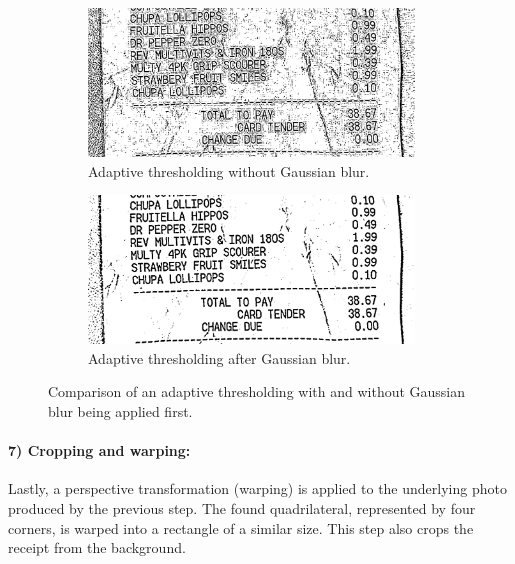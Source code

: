 \documentclass[
  digital, %
  table,   %
  oneside, %
  lof,     %
  lot,     %
]{fithesis3}
\newcommand\half{0.45}
\newcommand\subfigsize{0.95}
\begin{document}
\begin{figure}
    \centering
    \begin{subfigure}[t]{\half\textwidth}
      \centering
      \includegraphics[width=\subfigsize\textwidth]{figures/image_processing/adaptive_thresholding_no_blur}
      \caption{Adaptive thresholding without Gaussian blur.}
    \end{subfigure}
    \begin{subfigure}[t]{\half\textwidth}
      \centering
      \includegraphics[width=\subfigsize\textwidth]{figures/image_processing/adaptive_thresholding}
      \caption{Adaptive thresholding after Gaussian blur.}
    \end{subfigure}
    \caption{Comparison of an adaptive thresholding with and without Gaussian blur being applied first.}
    \label{fig:adaptive_thresholding}
\end{figure}

\paragraph{7) Cropping and warping:} Lastly, a perspective transformation (warping) is applied to the underlying photo produced by the previous step.
The found quadrilateral, represented by four corners, is warped into a rectangle of a similar size. This step also crops the receipt from the background. 
\end{document}
